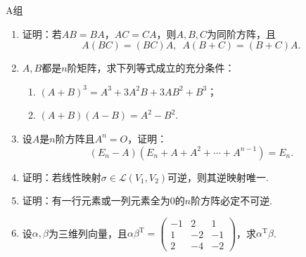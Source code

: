 \centerline{\heiti A组}
\begin{enumerate}
    \item 证明：若$AB=BA$，$AC=CA$，则$A,B,C$为同阶方阵，且
          \[A(BC)=(BC)A,\enspace A(B+C)=(B+C)A.\]

    \item $A,B$都是$n$阶矩阵，求下列等式成立的充分条件：
          \begin{enumerate}
              \item $(A+B)^3=A^3+3A^2B+3AB^2+B^3$；

              \item $(A+B)(A-B)=A^2-B^2$.
          \end{enumerate}

    \item 设$A$是$n$阶方阵且$A^n=O$，证明：
          \[(E_n-A)(E_n+A+A^2+\cdots+A^{n-1})=E_n.\]

    \item 证明：若线性映射$\sigma \in \mathcal{L}(V_1,V_2)$可逆，则其逆映射唯一.

    \item 证明：有一行元素或一列元素全为0的$n$阶方阵必定不可逆.

    \item 设$\alpha,\beta$为三维列向量，且$\alpha\beta^\mathrm{T}=\begin{pmatrix}
        -1 & 2  & 1  \\
        1  & -2 & -1 \\
        2  & -4 & -2
    \end{pmatrix}$，求$\alpha^\mathrm{T}\beta$.
\end{enumerate}

